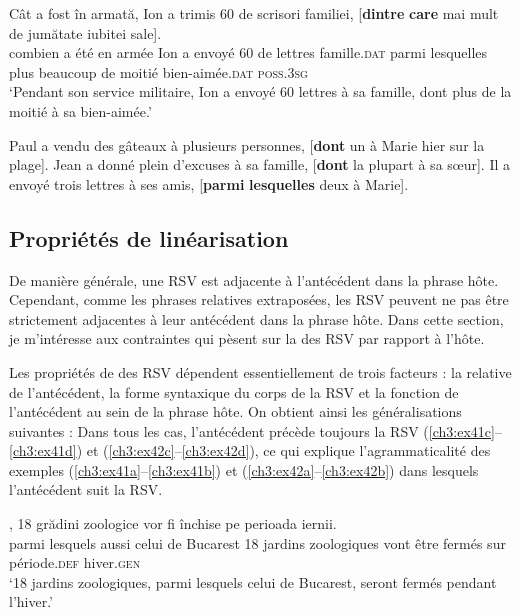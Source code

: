 \ex 
\gll Cât  a  fost  în  armată,  Ion  a  trimis  60  de  scrisori familiei, [\textbf{dintre} \textbf{care}  mai  mult  de  jumătate  iubitei  sale]. \label{ch3:ex39c}\\
combien  a  été  en  armée  Ion  a  envoyé  60  de  lettres  famille.\textsc{dat} parmi  lesquelles  plus  beaucoup  de  moitié  bien-aimée.\textsc{dat} \textsc{poss.3sg} \\
\glt ‘Pendant son service militaire, Ion a envoyé 60 lettres à sa famille, dont plus de la moitié à sa bien-aimée.’
\z 
\z 


\ea\label{ch3:ex40} 
\ea 
Paul a vendu des gâteaux à plusieurs personnes, [\textbf{dont} un à Marie hier sur la plage].
\ex
Jean a donné plein d’excuses à sa famille, [\textbf{dont} la plupart à sa sœur].
\ex 
Il a envoyé trois lettres à ses amis, [\textbf{parmi} \textbf{lesquelles} deux à Marie].
\z 
\z


\subsection{Propriétés de linéarisation}\label{ch3:sect3.2.3}

\largerpage[-2]
De manière générale, une RSV est adjacente à l’antécédent dans la phrase hôte. Cependant, comme les phrases relatives extraposées, les RSV peuvent ne pas être strictement adjacentes à leur antécédent dans la phrase hôte. Dans cette section, je m’intéresse aux contraintes qui pèsent sur la  des RSV par rapport à l’hôte.

Les propriétés de  des RSV dépendent essentiellement de trois facteurs : la  relative de l’antécédent, la forme syntaxique du corps de la RSV et la fonction de l’antécédent au sein de la phrase hôte. On obtient ainsi les généralisations suivantes : Dans tous les cas, l’antécédent précède toujours la RSV (\ref{ch3:ex41c}--\ref{ch3:ex41d}) et (\ref{ch3:ex42c}--\ref{ch3:ex42d}), ce qui explique l’agrammaticalité des exemples (\ref{ch3:ex41a}--\ref{ch3:ex41b}) et (\ref{ch3:ex42a}--\ref{ch3:ex42b}) dans lesquels l’antécédent suit la RSV.

\ea \label{ch3:ex41}
\ea
{},  18  grădini  zoologice  vor  fi închise  pe  perioada  iernii. \label{ch3:ex41a}\\
parmi  lesquels  aussi  celui  de  Bucarest  18  jardins  zoologiques  vont  être fermés  sur période.\textsc{def}  hiver.\textsc{gen} \\
\glt ‘18 jardins zoologiques, parmi lesquels celui de Bucarest, seront fermés pendant l’hiver.’ 

